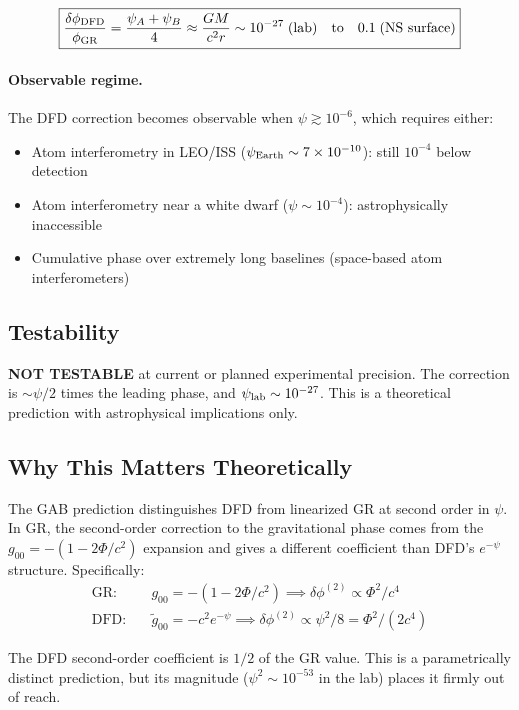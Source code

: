 \documentclass[11pt]{article}
\begin{document}
\begin{equation}
\boxed{\frac{\delta\phi_{\rm DFD}}{\phi_{\rm GR}} = \frac{\psi_A + \psi_B}{4}
\approx \frac{GM}{c^2 r} \sim 10^{-27}\;\text{(lab)} \quad\text{to}\quad 0.1\;\text{(NS surface)}}
\end{equation}

\paragraph{Observable regime.} The DFD correction becomes observable when $\psi \gtrsim
10^{-6}$, which requires either:
\begin{itemize}
\item Atom interferometry in LEO/ISS ($\psi_{\rm Earth} \sim 7 \times 10^{-10}$): still
$10^{-4}$ below detection
\item Atom interferometry near a white dwarf ($\psi \sim 10^{-4}$): astrophysically
inaccessible
\item Cumulative phase over extremely long baselines (space-based atom interferometers)
\end{itemize}

\subsection{Testability}

\textbf{NOT TESTABLE} at current or planned experimental precision. The correction is
$\sim \psi/2$ times the leading phase, and $\psi_{\rm lab} \sim 10^{-27}$. This is a
theoretical prediction with astrophysical implications only.

\subsection{Why This Matters Theoretically}

The GAB prediction distinguishes DFD from linearized GR at second order in $\psi$.
In GR, the second-order correction to the gravitational phase comes from the
$g_{00} = -(1 - 2\Phi/c^2)$ expansion and gives a different coefficient than DFD's
$e^{-\psi}$ structure. Specifically:
\begin{align}
\text{GR:} &\quad g_{00} = -(1 - 2\Phi/c^2) \implies \delta\phi^{(2)} \propto \Phi^2/c^4 \\
\text{DFD:} &\quad \tilde{g}_{00} = -c^2 e^{-\psi} \implies \delta\phi^{(2)} \propto \psi^2/8 = \Phi^2/(2c^4)
\end{align}

The DFD second-order coefficient is $1/2$ of the GR value. This is a parametrically
distinct prediction, but its magnitude ($\psi^2 \sim 10^{-53}$ in the lab) places it
firmly out of reach.
\end{document}
